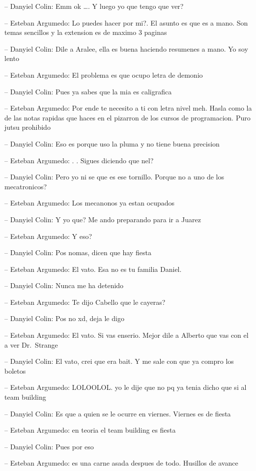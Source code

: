 -- Danyiel Colin: Emm ok \ldots. Y luego yo que tengo que ver?

-- Esteban Argumedo: Lo puedes hacer por mi?. El asunto es que es a
mano. Son temas sencillos y la extension es de maximo 3 paginas

-- Danyiel Colin: Dile a Aralee, ella es buena haciendo resumenes a
mano. Yo soy lento

-- Esteban Argumedo: El problema es que ocupo letra de demonio

-- Danyiel Colin: Pues ya sabes que la mia es caligrafica

-- Esteban Argumedo: Por ende te necesito a ti con letra nivel meh.
Hasla como la de las notas rapidas que haces en el pizarron de los
cursos de programacion. Puro jutsu prohibido

-- Danyiel Colin: Eso es porque uso la pluma y no tiene buena precision

-- Esteban Argumedo: . . Sigues diciendo que nel?

-- Danyiel Colin: Pero yo ni se que es ese tornillo. Porque no a uno de
los mecatronicos?

-- Esteban Argumedo: Los mecanonos ya estan ocupados

-- Danyiel Colin: Y yo que? Me ando preparando para ir a Juarez

-- Esteban Argumedo: Y eso?

-- Danyiel Colin: Pos nomas, dicen que hay fiesta

-- Esteban Argumedo: El vato. Esa no es tu familia Daniel.

-- Danyiel Colin: Nunca me ha detenido

-- Esteban Argumedo: Te dijo Cabello que le cayeras?

-- Danyiel Colin: Pos no xd, deja le digo

-- Esteban Argumedo: El vato. Si vas enserio. Mejor dile a Alberto que
vas con el a ver Dr.~Strange

-- Danyiel Colin: El vato, crei que era bait. Y me sale con que ya
compro los boletos

-- Esteban Argumedo: LOLOOLOL. yo le dije que no pq ya tenia dicho que
si al team building

-- Danyiel Colin: Es que a quien se le ocurre en viernes. Viernes es de
fiesta

-- Esteban Argumedo: en teoria el team building es fiesta

-- Danyiel Colin: Pues por eso

-- Esteban Argumedo: es una carne asada despues de todo. Husillos de
avance

